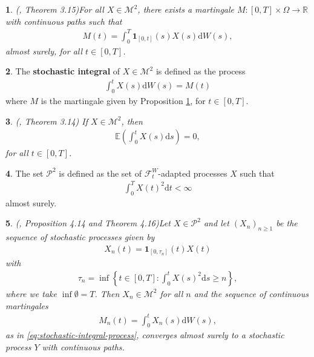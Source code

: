 \documentclass[english]{article}
\numberwithin{equation}{section}
\numberwithin{figure}{section}
\theoremstyle{bolddescit}
\newtheorem{theorem}{\protect\theoremname}[section]
\theoremstyle{definition}
\newtheorem{definition}[theorem]{\protect\definitionname}
\theoremstyle{definition}
\theoremstyle{plain}
\theoremstyle{plain}
\theoremstyle{bolddesc}
\theoremstyle{plain}
\newtheorem{proposition}[theorem]{\protect\propositionname}
\theoremstyle{remark}
\providecommand{\definitionname}{Definition}
\providecommand{\propositionname}{Proposition}
\providecommand{\theoremname}{Theorem}
\begin{document}
\begin{proposition}(\cite{capinski_stochastic_2012}, Theorem 3.15)\label{prop:stochastic-integral-martingale}
  For all $X \in \mathcal{M}^2$, there exists a martingale $M : [0,T] \times \Omega \to \mathbb{R}$ with continuous paths such that
  \begin{align*}
    M(t) = \int_0^T \mathbf{1}_{[0,t]}(s) X(s) \mathrm{d}W(s),
  \end{align*}
  almost surely, for all $t \in [0,T]$.
\end{proposition}

\begin{definition}\label{def:stochastic-integral-as-process}
  The \textbf{stochastic integral} of $X \in \mathcal{M}^2$ is defined as the process
  \begin{align}\label{eq:stochastic-integral-process}
    \int_0^t X(s) \mathrm{d}W(s) = M(t)
  \end{align}
  where $M$ is the martingale given by Proposition \ref{prop:stochastic-integral-martingale}, for $t \in [0,T]$.
\end{definition}

\begin{theorem}\label{thm:stochastic-integral-expectation-m2}
  (\cite{capinski_stochastic_2012}, Theorem 3.14)
  If $X \in \mathcal{M}^2$, then
  \begin{align*}
    \mathbb{E}\left(\int_0^t X(s) \mathrm{d}s\right) = 0,
  \end{align*}
  for all $t \in [0,T]$.
\end{theorem}

\begin{definition}
  The set $\mathcal{P}^2$ is defined as the set of $\mathcal{F}^W_t$-adapted processes $X$ such that
  \begin{align*}
    \int_0^T X(t)^2 \mathrm{d}t < \infty
  \end{align*}
  almost surely.
\end{definition}

\begin{proposition}(\cite{capinski_stochastic_2012}, Proposition 4.14 and Theorem 4.16)\label{prop:p2-localising-sequence}
  Let $X \in \mathcal{P}^2$ and let $(X_n)_{n \ge 1}$ be the sequence of stochastic processes given by
  \begin{align*}
    X_n(t) = \mathbf{1}_{[0,\tau_n]}(t) X(t)
  \end{align*}
  with
  \begin{align*}
    \tau_n = \inf \left\{ t \in [0,T] : \int_0^t X(s)^2 \mathrm{d}s \ge n \right\},
  \end{align*}
  where we take $\inf \emptyset = T$.
  Then $X_n \in \mathcal{M}^2$ for all $n$ and the sequence of continuous martingales
  \begin{align*}
    M_n(t) = \int_0^t X_n(s) \mathrm{d}W(s),
  \end{align*}
  as in \eqref{eq:stochastic-integral-process}, converges almost surely to a stochastic process $Y$ with continuous paths.
\end{proposition}
\end{document}
